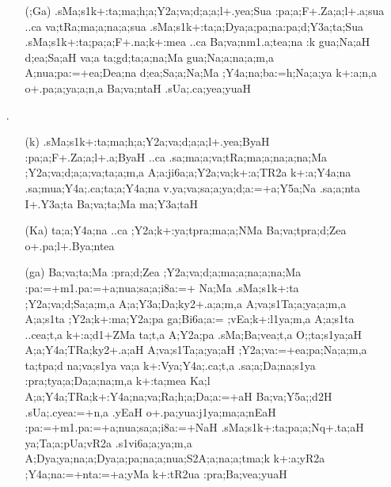 \begin{spacing}{1.15}
\begin{itemize} 
\item[] \begin{itemize}
       \item[({\sktf ;Ga})] {\sktf .sMa;s1k+:ta;ma;h;a;Y2a;va;d;a;a;l+.yea;Sua
:pa;a;F+.Za;a;l+.a;sua ..ca va;tRa;ma;a;na;a;sua .sMa;s1k+:ta;a;Dya;a;pa;na\ZF{-}:pa;d;Y3a;ta;Sua
.sMa;s1k+:ta;pa;a;F+.na;k+:mea ..ca
Ba;va;nm1.a;tea;na :k gua;Na;aH d;ea;Sa;aH
va;a ta;gd;ta;a;na;Ma gua;Na;a;na;a;m,a A;nua;pa:=+ea;Dea;na
d;ea;Sa;a;Na;Ma ;Y4a;na;ba:=h;Na;a;ya k+:a;n,a o+.pa;a;ya;a;n,a Ba;va;ntaH .sUa;.ca;yea;yuaH
}
 \end{itemize}
 
 \item[{\sktf 18}.]\begin{itemize}
               \item[({\sktf k})] {\sktf .sMa;s1k+:ta;ma;h;a;Y2a;va;d;a;a;l+.yea;ByaH
:pa;a;F+.Za;a;l+.a;ByaH ..ca .sa;ma;a;va;tRa;ma;a;na;a;na;Ma
;Y2a;va;d;a;a;va;ta;a;m,a A;a:ji6a;a;Y2a;va;k+:a;TR2a k+:a;Y4a;na
.sa;mua;Y4a;.ca;ta;a;Y4a;na v.ya;va;sa;a;ya;d;a:=+a;Y5a;Na
.sa;a;nta I+.Y3a;ta Ba;va;ta;Ma ma;Y3a;taH}
               
       \item[({\sktf Ka})] {\sktf ta;a;Y4a;na ..ca ;Y2a;k+:ya;tpra;ma;a;NMa
Ba;va;tpra;d;Zea o+.pa;l+.Bya;ntea}
 
       \item[({\sktf ga})] {\sktf Ba;va;ta;Ma :pra;d;Zea
;Y2a;va;d;a;ma;a;na;a;na;Ma :pa:=+m1.pa:=+a;nua;sa;a;i8a:=+%
Na;Ma .sMa;s1k+:ta ;Y2a;va;d;Sa;a;m,a
A;a;Y3a;Da;ky2+.a;a;m,a A;va;s1Ta;a;ya;a;m,a A;a;s1ta
;Y2a;k+:ma;Y2a;pa ga;Bi6a;a:= ;vEa;k+:l1ya;m,a
A;a;s1ta ..cea;t,a\ZF{,} k+:a;d1+ZMa ta;t,a
A;Y2a;pa .sMa;Ba;vea;t,a O;;ta;s1ya;aH A;a;Y4a;TRa;ky2+.a;aH
A;va;s1Ta;a;ya;aH ;Y2a;va:=+ea;pa;Na;a;m,a\ZF{,} ta;tpa;d na;va;s1ya va;a
k+:Vya;Y4a;.ca;t,a .sa;a;Da;na;s1ya :pra;tya;a;Da;a;na;m,a k+:ta;mea
Ka;l A;a;Y4a;TRa;k+:Y4a;na;va;Ra;h;a;Da;a:=+aH
Ba;va;Y5a;;d2H .sUa;.cyea:=+n,a\ZF{,} .yEaH
o+.pa;yua:j1ya;ma;a;nEaH :pa:=+m1.pa:=+a;nua;sa;a;i8a:=+NaH%
 .sMa;s1k+:ta;pa;a;Nq+.ta;aH
ya;Ta;a;pUa;vR2a .s1vi6a;a;ya;m,a A;Dya;ya;na;a;Dya;a;pa;na;a;nua;S2A;a;na;a;tma;k k+:a;yR2a ;Y4a;na:=+nta:=+a;yMa k+:tR2ua
:pra;Ba;vea;yuaH } 
     

\end{itemize}
\end{itemize}
\end{spacing}
